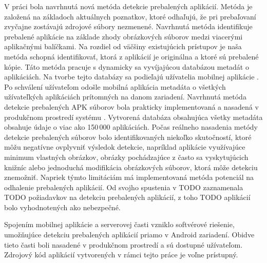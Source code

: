 V práci bola navrhnutá nová metóda detekcie prebalených aplikácií. Metóda je založená na základoch aktuálnych poznatkov, ktoré odhaľujú, že pri prebaľovaní zvyčajne zostávajú zdrojové súbory nezmenené. Navrhnutá metóda identifikuje prebalené aplikácie na základe zhody obrázkových súborov medzi viacerými aplikačnými balíčkami. Na rozdiel od väčšiny existujúcich prístupov je naša metóda schopná identifikovať, ktorá z aplikácií je originálna a ktoré sú prebalené kópie. Táto metóda pracuje s dynamicky sa vyvíjajúcou databázou metadát o aplikáciách. Na tvorbe tejto databázy sa podieľajú užívatelia mobilnej aplikácie . Po schválení užívateľom odošle mobilná aplikácia metadáta o všetkých užívateľkých aplikáciách prítomných na danom zariadení. Navrhnutá metóda detekcie prebalených APK súborov bola prakticky implementovaná a nasadená v produkčnom prostredí systému .
Vytvorená databáza obsahujúca všetky metadáta obsahuje údaje o viac ako 150\,000 aplikáciách. Počas reálneho nasadenia metódy detekcie prebalených súborov bolo identifikovaných niekoľko skutočností, ktoré môžu negatívne ovplyvniť výsledok detekcie, napríklad aplikácie využívajúce minimum vlastných obrázkov, obrázky pochádzajúce z často sa vyskytujúcich knižníc alebo jednoduchá modifikácia obrázkových súborov, ktorá môže detekciu znemožniť. Napriek týmto limitáciám má implementovaná metóda potenciál na odhalenie prebalených aplikácií. Od svojho spustenia v TODO zaznamenala TODO požiadavkov na detekciu prebalených aplikácií, z toho TODO aplikácií bolo vyhodnotených ako nebezpečné.

Spojením mobilnej aplikácie a serverovej časti vzniklo softvérové riešenie, umožňujúce detekciu prebalených aplikácií priamo v Android zariadení. Obidve tieto časti boli nasadené v produkčnom prostredí a sú dostupné užívateľom. Zdrojový kód aplikácií vytvorených v rámci tejto práce je voľne prístupný.
